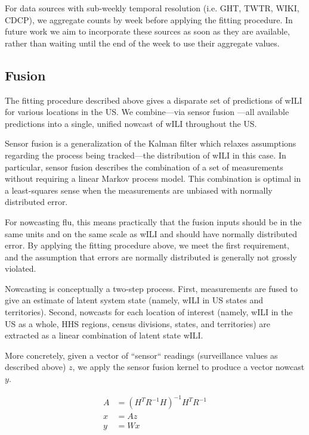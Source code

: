 \documentclass[10pt,letterpaper]{article}
\begin{document}
For data sources with sub-weekly temporal resolution (i.e. GHT, TWTR, WIKI,
CDCP), we aggregate counts by week before applying the fitting procedure. In
future work we aim to incorporate these sources as soon as they are available,
rather than waiting until the end of the week to use their aggregate values.

\subsection*{Fusion}

The fitting procedure described above gives a disparate set of predictions of
wILI for various locations in the US. We combine---via sensor fusion
\cite{farrow2016modeling}---all available predictions into a single, unified
nowcast of wILI throughout the US.

Sensor fusion is a generalization of the Kalman filter \cite{kalman1960new}
which relaxes assumptions regarding the process being tracked---the
distribution of wILI in this case. In particular, sensor fusion describes the
combination of a set of measurements without requiring a linear Markov process
model. This combination is optimal in a least-squares sense when the
measurements are unbiased with normally distributed error.

For nowcasting flu, this means practically that the fusion inputs should be in
the same units and on the same scale as wILI and should have normally
distributed error. By applying the fitting procedure above, we meet the first
requirement, and the assumption that errors are normally distributed is
generally not grossly violated.

Nowcasting is conceptually a two-step process. First, measurements are fused to
give an estimate of latent system state (namely, wILI in US states and
territories). Second, nowcasts for each location of interest (namely, wILI in
the US as a whole, HHS regions, census divisions, states, and territories) are
extracted as a linear combination of latent state wILI.

More concretely, given a vector of ``sensor`` readings (surveillance values as
described above) $z$, we apply the sensor fusion kernel to produce a vector
nowcast $y$.

\begin{align*}
A &= (H^T R^{-1} H)^{-1} H^T R^{-1} \\
x &= A z \\
y &= W x
\end{align*}
\end{document}
